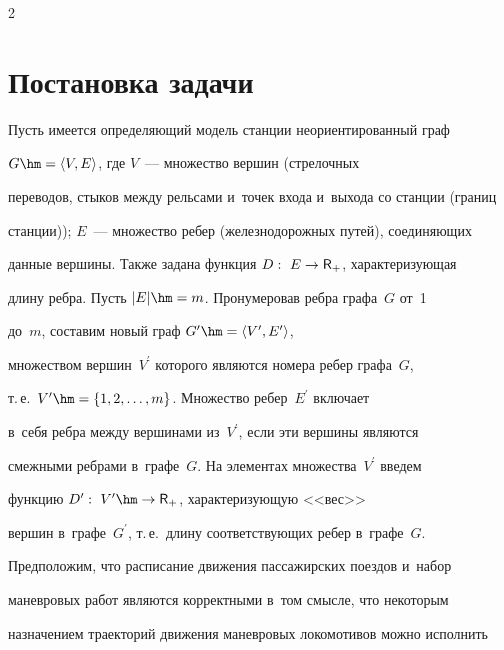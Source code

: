 \begin{multicols}{2}
\vspace*{-8pt}





\section{Постановка задачи}





\vspace*{-2pt}





      Пусть имеется определяющий модель станции неориентированный граф 


$G\hm= \langle V, E\rangle$, где $V$~--- множество вершин (стрелочных 


переводов, стыков между рельсами и~точек входа и~выхода со станции (границ 


станции)); $E$~--- множество ребер (железнодорожных путей), соединяющих 


данные вершины. Также задана функция $D:\ E\to {\sf R}_+$, характеризующая 


длину ребра. Пусть $\vert E\vert \hm=m$. Пронумеровав ребра графа~$G$ от~1 


до~$m$, составим новый граф $G^\prime\hm= \langle V^\prime, E^\prime\rangle$, 


множеством вершин~$V^\prime$ которого являются номера ребер графа~$G$, 


т.\,е.\ $V^\prime\hm= \{1,2,\ldots , m\}$. Множество ребер~$E^\prime$ включает 


в~себя ребра между вершинами из~$V^\prime$, если эти вершины являются 


смежными ребрами в~графе~$G$. На элементах множества~$V^\prime$ введем 


функцию $D^\prime:\ V^\prime \hm \to {\sf R}_+$, характеризующую <<вес>> 


вершин в~графе~$G^\prime$, т.\,е.\ длину соответствующих ребер в~графе~$G$.


      


      Предположим, что расписание движения пассажирских поездов и~набор 


маневровых работ являются корректными в~том смысле, что некоторым 


назначением траекторий движения маневровых локомотивов можно исполнить 



\end{multicols}
